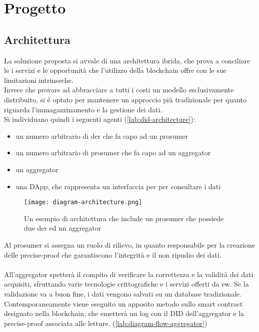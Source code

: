 \chapter{Progetto}

\section{Architettura}
La soluzione proposta si avvale di una architettura ibrida, che prova a conciliare le i servizi e le opportunità
che l'utilizzo della blockchain offre con le sue limitazioni intrinseche. \\
Invece che provare ad abbracciare a tutti i costi un modello esclusivamente distribuito, si è optato per
mantenere un approccio più tradizionale per quanto riguarda l'immagazzinamento e la gestione dei dati. \\

Si individuano quindi i seguenti agenti (\autoref{lab:did-architecture}):
\begin{itemize}
    \item un numero arbitrario di \gls{der} che fa capo ad un \gls{prosumer}
    \item un numero arbitrario di \gls{prosumer} che fa capo ad un \gls{aggregator}
    \item un \gls{aggregator}
    \item una DApp, che rappresenta un interfaccia per per consultare i dati
\end{itemize}

\begin{figure}[h]
    \texttt{[image: diagram-architecture.png]}
    \centering
    \caption{Un esempio di architettura che include un \gls{prosumer} che possiede due \gls{der} ed un \gls{aggregator}}
    \label{lab:diagram-architecture}
\end{figure}

Al \gls{prosumer} si assegna un ruolo di rilievo, in quanto responsabile per la creazione delle precise-proof
che garantiscono l'integrità e il non ripudio dei dati. \\
\\
All'\gls{aggregator} spetterà il compito di verificare la correttezza e la validità dei dati acquisiti,
sfruttando varie tecnologie crittografiche e i servizi offerti da \gls{ew}.
Se la validazione va a buon fine, i dati vengono salvati su un database tradizionale. \\
Contemporaneamente viene eseguito un apposito metodo sullo smart contract designato nella blockchain,
che emetterà un log con il DID dell'\gls{aggregator} e la precise-proof associata alle letture. (\autoref{lab:diagram-flow-aggregator})\\

